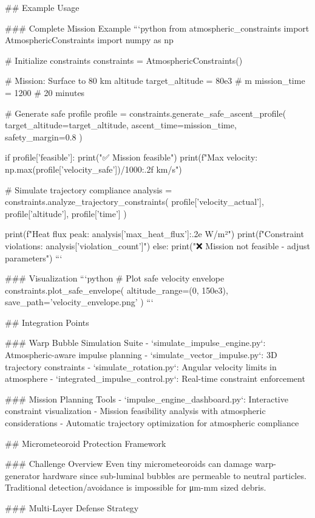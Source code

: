 ## Example Usage

### Complete Mission Example
```python
from atmospheric_constraints import AtmosphericConstraints
import numpy as np

# Initialize constraints
constraints = AtmosphericConstraints()

# Mission: Surface to 80 km altitude
target_altitude = 80e3  # m
mission_time = 1200     # 20 minutes

# Generate safe profile
profile = constraints.generate_safe_ascent_profile(
    target_altitude=target_altitude,
    ascent_time=mission_time,
    safety_margin=0.8
)

if profile['feasible']:
    print("✅ Mission feasible")
    print(f"Max velocity: {np.max(profile['velocity_safe'])/1000:.2f} km/s")
    
    # Simulate trajectory compliance
    analysis = constraints.analyze_trajectory_constraints(
        profile['velocity_actual'],
        profile['altitude'], 
        profile['time']
    )
    
    print(f"Heat flux peak: {analysis['max_heat_flux']:.2e} W/m²")
    print(f"Constraint violations: {analysis['violation_count']}")
else:
    print("❌ Mission not feasible - adjust parameters")
```

### Visualization
```python
# Plot safe velocity envelope
constraints.plot_safe_envelope(
    altitude_range=(0, 150e3),
    save_path='velocity_envelope.png'
)
```

## Integration Points

### Warp Bubble Simulation Suite
- `simulate_impulse_engine.py`: Atmospheric-aware impulse planning
- `simulate_vector_impulse.py`: 3D trajectory constraints
- `simulate_rotation.py`: Angular velocity limits in atmosphere
- `integrated_impulse_control.py`: Real-time constraint enforcement

### Mission Planning Tools
- `impulse_engine_dashboard.py`: Interactive constraint visualization
- Mission feasibility analysis with atmospheric considerations
- Automatic trajectory optimization for atmospheric compliance

## Micrometeoroid Protection Framework

### Challenge Overview
Even tiny micrometeoroids can damage warp-generator hardware since sub-luminal bubbles are permeable to neutral particles. Traditional detection/avoidance is impossible for μm-mm sized debris.

### Multi-Layer Defense Strategy


